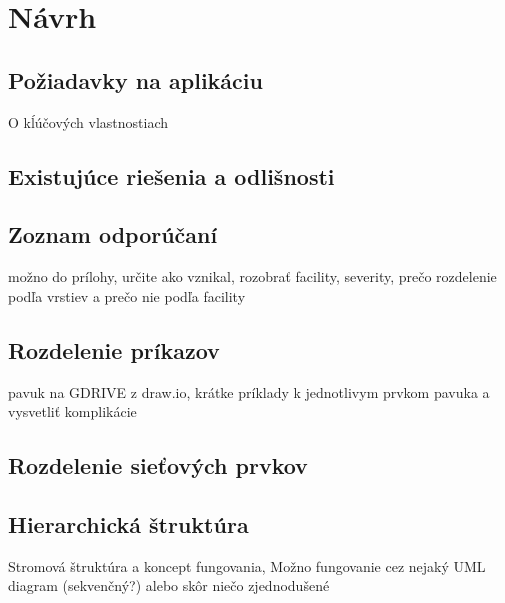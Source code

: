 \chapter{Návrh}

\section{Požiadavky na aplikáciu}
O kĺúčových vlastnostiach

\section{Existujúce riešenia a odlišnosti}

\section{Zoznam odporúčaní}
 možno do prílohy, určite ako vznikal, rozobrať facility, severity, prečo rozdelenie podľa vrstiev a prečo nie podľa facility

\section{Rozdelenie príkazov}
 pavuk na GDRIVE z draw.io, krátke príklady k jednotlivym prvkom pavuka a vysvetliť komplikácie  

\section{Rozdelenie sieťových prvkov}

\section{Hierarchická štruktúra}
Stromová štruktúra a koncept fungovania, Možno fungovanie cez nejaký UML diagram (sekvenčný?) alebo skôr niečo zjednodušené



